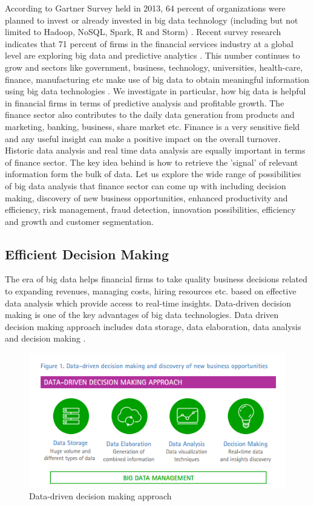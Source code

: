 \documentclass[sigconf]{acmart}
\begin{document}
According to Gartner Survey held in 2013, 64 percent of organizations were planned to invest or already invested in big data technology (including but not limited to Hadoop, NoSQL, Spark, R and Storm) \cite{gartner-survey}. Recent survey research indicates that 71 percent of firms in the financial services industry at a global level are exploring big data and predictive analytics \cite{accenture-next-generation-financial}. This number continues to grow and sectors like government, business, technology, universities, health-care, finance, manufacturing etc make use of big data to obtain meaningful information using big data technologies \cite{wiki-bigdata}. We investigate in particular, how big data is helpful in financial firms in terms of predictive analysis and profitable growth. The finance sector also contributes to the daily data generation from products and marketing, banking, business, share market etc. Finance is a very sensitive field and any useful insight can make a positive impact on the overall turnover. Historic data analysis and real time data analysis are equally important in terms of finance sector. The key idea behind is how to retrieve the 'signal' of relevant information form the bulk of data. Let us explore the wide range of possibilities of big data analysis that finance sector can come up with including decision making, discovery of new business opportunities, enhanced productivity and efficiency, risk management, fraud detection, innovation possibilities, efficiency and growth and customer segmentation.

\subsection{Efficient Decision Making}

The era of big data helps financial firms to take quality business decisions related to expanding revenues, managing costs, hiring resources etc. based on effective data analysis which provide access to real-time insights.  Data-driven decision making is one of the key advantages of big data technologies. Data driven decision making approach includes data storage, data elaboration, data analysis and decision making \cite{accenture-next-generation-financial}.

\begin{figure}[htb]
  \centering
  \includegraphics[width=1.0\columnwidth]{images/Figure1.png}
  \caption{Data-driven decision making approach 
  \cite{accenture-next-generation-financial}}
  \label{fig:Figure1} 
\end{figure}
\end{document}
